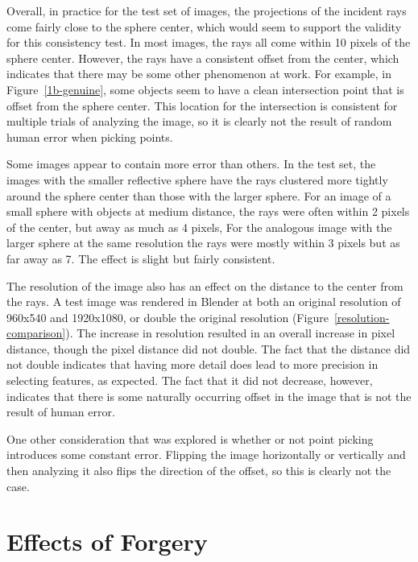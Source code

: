 \documentclass{thesis}
\begin{document}
Overall, in practice for the test set of images, the projections of the incident rays come fairly close to the sphere center, which would seem to support the validity for this consistency test. In most images, the rays all come within 10 pixels of the sphere center. However, the rays have a consistent offset from the center, which indicates that there may be some other phenomenon at work. For example, in Figure~\ref{1b-genuine}, some objects seem to have a clean intersection point that is offset from the sphere center. This location for the intersection is consistent for multiple trials of analyzing the image, so it is clearly not the result of random human error when picking points.

Some images appear to contain more error than others. In the test set, the images with the smaller reflective sphere have the rays clustered more tightly around the sphere center than those with the larger sphere. For an image of a small sphere with objects at medium distance, the rays were often within 2 pixels of the center, but away as much as 4 pixels, For the analogous image with the larger sphere at the same resolution the rays were mostly within 3 pixels but as far away as 7. The effect is slight but fairly consistent.

The resolution of the image also has an effect on the distance to the center from the rays. A test image was rendered in Blender at both an original resolution of 960x540 and 1920x1080, or double the original resolution (Figure~\ref{resolution-comparison}). The increase in resolution resulted in an overall increase in pixel distance, though the pixel distance did not double. The fact that the distance did not double indicates that having more detail does lead to more precision in selecting features, as expected. The fact that it did not decrease, however, indicates that there is some naturally occurring offset in the image that is not the result of human error.

One other consideration that was explored is whether or not point picking introduces some constant error. Flipping the image horizontally or vertically and then analyzing it also flips the direction of the offset, so this is clearly not the case.



\section{Effects of Forgery}
\end{document}
